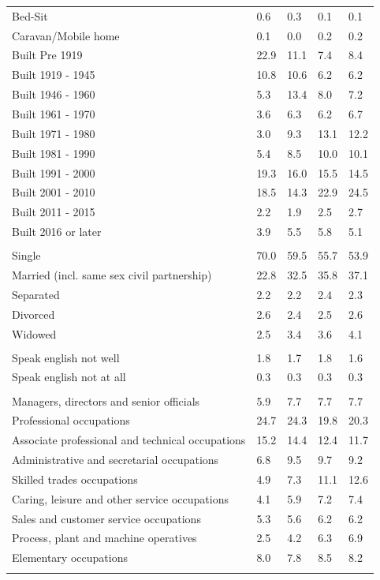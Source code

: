 \documentclass{article}
\begin{document}
\begin{table}[h]
\begin{tabular}{KTTTT}
Bed-Sit & 0.6& 0.3& 0.1& 0.1\\
Caravan/Mobile home & 0.1& 0.0& 0.2& 0.2\\
    \hline
Built Pre 1919 & 22.9& 11.1&  7.4&  8.4\\
Built 1919 - 1945 & 10.8& 10.6&  6.2&  6.2\\
Built  1946 - 1960 &  5.3& 13.4&  8.0&  7.2\\
Built  1961 - 1970 & 3.6& 6.3& 6.2& 6.7\\
Built  1971 - 1980 &  3.0&  9.3& 13.1& 12.2\\
Built  1981 - 1990 &  5.4&  8.5& 10.0& 10.1\\
Built  1991 - 2000 & 19.3& 16.0& 15.5& 14.5\\
Built  2001 - 2010 & 18.5& 14.3& 22.9& 24.5\\
Built  2011 - 2015 & 2.2& 1.9& 2.5& 2.7\\
Built  2016 or later & 3.9& 5.5& 5.8& 5.1\\
\hline
    \\
    \hline
Single & 70.0& 59.5& 55.7& 53.9\\
Married (incl. same sex civil partnership) & 22.8& 32.5& 35.8& 37.1\\
Separated  & 2.2& 2.2& 2.4& 2.3\\
Divorced  & 2.6& 2.4& 2.5& 2.6\\
Widowed & 2.5& 3.4& 3.6& 4.1\\
\hline
    \\ 
    \hline
Speak english not well & 1.8& 1.7& 1.8& 1.6\\
Speak english not at all & 0.3& 0.3& 0.3& 0.3\\
\hline
    \\
    \hline
Managers, directors and senior officials & 5.9& 7.7& 7.7& 7.7\\
Professional occupations & 24.7& 24.3& 19.8& 20.3\\
Associate professional and technical occupations & 15.2& 14.4& 12.4& 11.7\\
Administrative and secretarial occupations & 6.8& 9.5& 9.7& 9.2\\
Skilled trades occupations &  4.9&  7.3& 11.1& 12.6\\
Caring, leisure and other service occupations & 4.1& 5.9& 7.2& 7.4\\
Sales and customer service occupations & 5.3& 5.6& 6.2& 6.2\\
Process, plant and machine operatives & 2.5& 4.2& 6.3& 6.9\\
Elementary occupations & 8.0& 7.8& 8.5& 8.2\\
\hline
\end{tabular}
\end{table}
\end{document}
